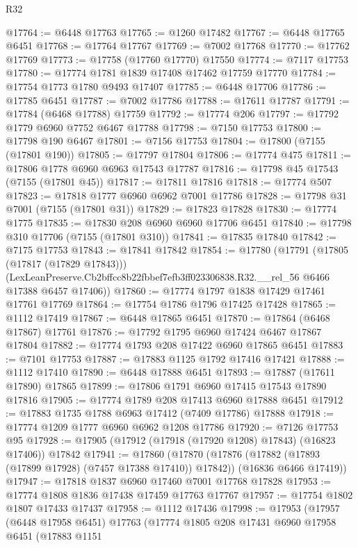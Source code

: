 \begin{lexlean}{R32}
\begin{coremodule}
@17764 := @6448 @17763
@17765 := @1260 @17482
@17767 := @6448 @17765 @6451
@17768 := @17764 @17767
@17769 := @7002 @17768
@17770 := @17762 @17769
@17773 := @17758 (@17760 @17770) @17550
@17774 := @7117 @17753
@17780 := @17774 @1781 @1839 @17408 @17462 @17759 @17770
@17784 := @17754 @1773 @1780 @9493 @17407
@17785 := @6448 @17706
@17786 := @17785 @6451
@17787 := @7002 @17786
@17788 := @17611 @17787
@17791 := @17784 (@6468 @17788) @17759
@17792 := @17774 @206
@17797 := @17792 @1779 @6960 @7752 @6467 @17788
@17798 := @7150 @17753
@17800 := @17798 @190 @6467
@17801 := @7156 @17753
@17804 := @17800 (@7155 (@17801 @190))
@17805 := @17797 @17804
@17806 := @17774 @475
@17811 := @17806 @1778 @6960 @6963 @17543 @17787
@17816 := @17798 @45 @17543 (@7155 (@17801 @45))
@17817 := @17811 @17816
@17818 := @17774 @507
@17823 := @17818 @1777 @6960 @6962 @7001 @17786
@17828 := @17798 @31 @7001 (@7155 (@17801 @31))
@17829 := @17823 @17828
@17830 := @17774 @1775
@17835 := @17830 @208 @6960 @6960 @17706 @6451
@17840 := @17798 @310 @17706 (@7155 (@17801 @310))
@17841 := @17835 @17840
@17842 := @7175 @17753
@17843 := @17841 @17842
@17854 := @17780
    (@17791
      (@17805 (@17817 (@17829 @17843)))
      (LexLeanPreserve.Cb2bffcc8b22fbbef7efb3ff023306838.R32.__rel_56 @6466 @17388 @6457 @17406))
@17860 := @17774 @1797 @1838 @17429 @17461 @17761 @17769
@17864 := @17754 @1786 @1796 @17425 @17428
@17865 := @1112 @17419
@17867 := @6448 @17865 @6451
@17870 := @17864 (@6468 @17867) @17761
@17876 := @17792 @1795 @6960 @17424 @6467 @17867 @17804
@17882 := @17774 @1793 @208 @17422 @6960 @17865 @6451
@17883 := @7101 @17753
@17887 := @17883 @1125 @1792 @17416 @17421
@17888 := @1112 @17410
@17890 := @6448 @17888 @6451
@17893 := @17887 (@17611 @17890) @17865
@17899 := @17806 @1791 @6960 @17415 @17543 @17890 @17816
@17905 := @17774 @1789 @208 @17413 @6960 @17888 @6451
@17912 := @17883 @1735 @1788 @6963 @17412 (@7409 @17786) @17888
@17918 := @17774 @1209 @1777 @6960 @6962 @1208 @17786
@17920 := @7126 @17753 @95
@17928 := @17905 (@17912 (@17918 (@17920 @1208) @17843) (@16823 @17406)) @17842
@17941 := @17860
    (@17870
      (@17876 (@17882 (@17893 (@17899 @17928) (@7457 @17388 @17410)) @17842))
      (@16836 @6466 @17419))
@17947 := @17818 @1837 @6960 @17460 @7001 @17768 @17828
@17953 := @17774 @1808 @1836 @17438 @17459 @17763 @17767
@17957 := @17754 @1802 @1807 @17433 @17437
@17958 := @1112 @17436
@17998 := @17953
    (@17957
      (@6448 @17958 @6451)
      @17763
      (@17774
        @1805
        @208
        @17431
        @6960
        @17958
        @6451
        (@17883
          @1151

\end{coremodule}
\end{lexlean}

